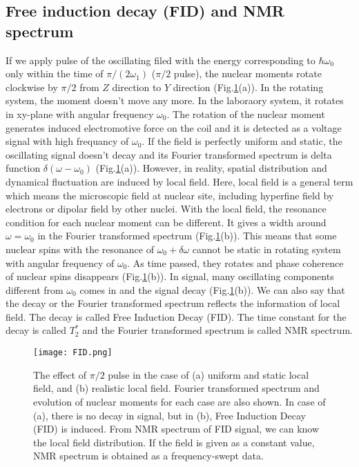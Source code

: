 \documentclass[a4,10.5pt]{report}
\begin{document}
\subsection{Free induction decay (FID) and NMR spectrum}
If we apply pulse of the oscillating filed with the energy corresponding to $\hbar\omega_0$ only within the time of $\pi/(2\omega_1)$ ($\pi/2$ pulse), 
the nuclear moments rotate clockwise by $\pi/2$ from $Z$ direction to $Y$ direction (Fig.\ref{FID}(a)).
In the rotating system, the moment doesn't move any more.
In the laboraory system, it rotates in xy-plane with angular frequency $\omega_0$.
The rotation of the nuclear moment generates induced electromotive force on the coil and it is detected as a voltage signal with high frequancy of $\omega_0$.
If the field is perfectly uniform and static, the oscillating signal doesn't decay and its Fourier transformed spectrum is delta function $\delta(\omega-\omega_0)$ (Fig.\ref{FID}(a)).
However, in reality, spatial distribution and dynamical fluctuation are induced by local field.
Here, local field is a general term which means the microscopic field at nuclear site, including hyperfine field by electrons or dipolar field by other nuclei.
With the local field, the resonance condition for each nuclear moment can be different.
It gives a width around $\omega = \omega_0$ in the Fourier transformed spectrum (Fig.\ref{FID}(b)).
This means that some nuclear spins with the resonance of $\omega_0 + \delta\omega$ cannot be static in rotating system with angular frequency of $\omega_0$.
As time passed, they rotates and phase coherence of nuclear spins disappears (Fig.\ref{FID}(b)).
In signal, many oscillating components different from $\omega_0$ comes in and the signal decay (Fig.\ref{FID}(b)).
We can also say that the decay or the Fourier transformed spectrum reflects the information of local field.
The decay is called Free Induction Decay (FID).
The time constant for the decay is called $T^*_2$ and the Fourier transformed spectrum is called NMR spectrum.

\begin{figure}
  \centering
  \texttt{[image: FID.png]}
  \caption{The effect of $\pi/2$ pulse in the case of (a) uniform and static local field, and (b) realistic local field.
  Fourier transformed spectrum and evolution of nuclear moments for each case are also shown.
  In case of (a), there is no decay in signal, but in (b), Free Induction Decay (FID) is induced.
  From NMR spectrum of FID signal, we can know the local field distribution.
  If the field is given as a constant value, NMR spectrum is obtained as a frequency-swept data.}
  \label{FID}
\end{figure}
\end{document}
